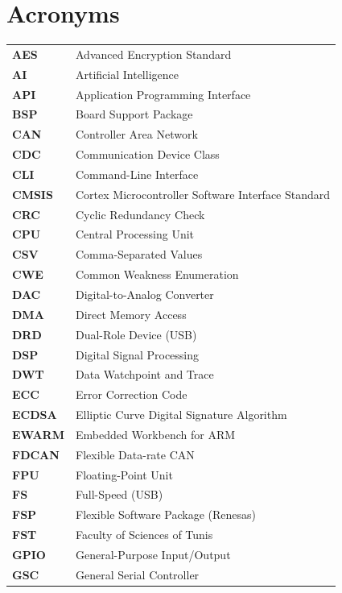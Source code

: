 \chapter{Acronyms}

\begin{tabular}{l l}

\textbf{AES} & Advanced Encryption Standard \\
\textbf{AI} & Artificial Intelligence \\
\textbf{API} & Application Programming Interface \\
\textbf{BSP} & Board Support Package \\
\textbf{CAN} & Controller Area Network \\
\textbf{CDC} & Communication Device Class \\
\textbf{CLI} & Command-Line Interface \\
\textbf{CMSIS} & Cortex Microcontroller Software Interface Standard \\
\textbf{CRC} & Cyclic Redundancy Check \\
\textbf{CPU} & Central Processing Unit \\
\textbf{CSV} & Comma-Separated Values \\
\textbf{CWE} & Common Weakness Enumeration \\
\textbf{DAC} & Digital-to-Analog Converter \\
\textbf{DMA} & Direct Memory Access \\
\textbf{DRD} & Dual-Role Device (USB) \\
\textbf{DSP} & Digital Signal Processing \\
\textbf{DWT} & Data Watchpoint and Trace \\
\textbf{ECC} & Error Correction Code \\
\textbf{ECDSA} & Elliptic Curve Digital Signature Algorithm \\
\textbf{EWARM} & Embedded Workbench for ARM \\
\textbf{FDCAN} & Flexible Data-rate CAN \\
\textbf{FPU} & Floating-Point Unit \\
\textbf{FS} & Full-Speed (USB) \\
\textbf{FSP} & Flexible Software Package (Renesas) \\
\textbf{FST} & Faculty of Sciences of Tunis \\
\textbf{GPIO} & General-Purpose Input/Output \\
\textbf{GSC} & General Serial Controller \\

\end{tabular}
